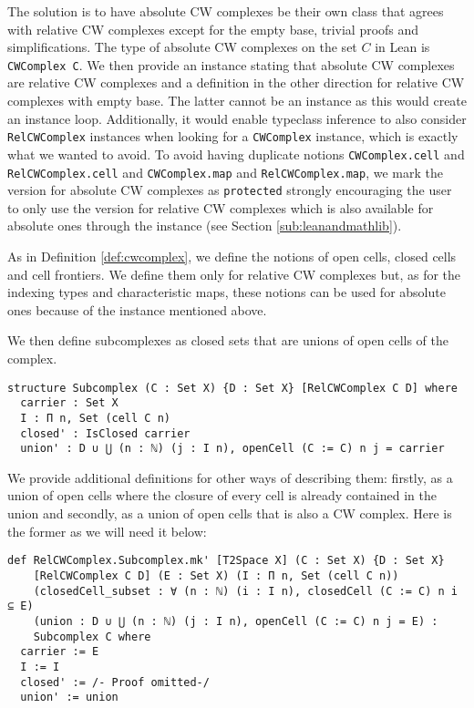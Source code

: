 The solution is to have absolute CW complexes be their own class that agrees with relative CW complexes except for the empty base, trivial proofs and simplifications. 
The type of absolute CW complexes on the set $C$ in Lean is \lstinline|CWComplex C|. 
We then provide an instance stating that absolute CW complexes are relative CW complexes and a definition in the other direction for relative CW complexes with empty base.
The latter cannot be an instance as this would create an instance loop.
Additionally, it would enable typeclass inference to also consider \lstinline|RelCWComplex| instances when looking for a \lstinline|CWComplex| instance, which is exactly what we wanted to avoid.
To avoid having duplicate notions \lstinline|CWComplex.cell| and \lstinline|RelCWComplex.cell| and \lstinline|CWComplex.map| and \lstinline|RelCWComplex.map|, we mark the version for absolute CW complexes as \lstinline|protected| strongly encouraging the user to only use the version for relative CW complexes which is also available for absolute ones through the instance (see Section \ref{sub:leanandmathlib}).

As in Definition \ref{def:cwcomplex}, we define the notions of open cells, closed cells and cell frontiers.
We define them only for relative CW complexes but, as for the indexing types and characteristic maps, these notions can be used for absolute ones because of the instance mentioned above. 

We then define subcomplexes as closed sets that are unions of open cells of the complex.

\begin{lstlisting}[frame=single]
structure Subcomplex (C : Set X) {D : Set X} [RelCWComplex C D] where
  carrier : Set X
  I : Π n, Set (cell C n)
  closed' : IsClosed carrier
  union' : D ∪ ⋃ (n : ℕ) (j : I n), openCell (C := C) n j = carrier
\end{lstlisting}

We provide additional definitions for other ways of describing them: firstly, as a union of open cells where the closure of every cell is already contained in the union and secondly, as a union of open cells that is also a CW complex.
Here is the former as we will need it below:

\begin{lstlisting}[frame=single]
def RelCWComplex.Subcomplex.mk' [T2Space X] (C : Set X) {D : Set X} 
    [RelCWComplex C D] (E : Set X) (I : Π n, Set (cell C n))
    (closedCell_subset : ∀ (n : ℕ) (i : I n), closedCell (C := C) n i ⊆ E)
    (union : D ∪ ⋃ (n : ℕ) (j : I n), openCell (C := C) n j = E) : 
    Subcomplex C where
  carrier := E
  I := I
  closed' := /- Proof omitted-/
  union' := union
\end{lstlisting}

